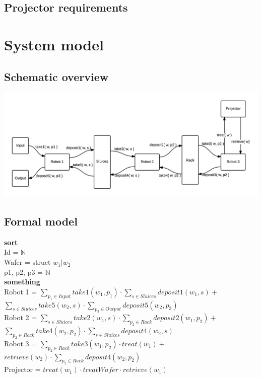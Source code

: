 \documentclass[12pt]{report}
\begin{document}
	\section{Projector requirements}
	\begin{itemize}
	\end{itemize}
	
	\chapter{System model}
	\section{Schematic overview}
	\includegraphics[scale=0.9]{modelschema}
	
	\section{Formal model}
	\textbf{sort}\\
		Id = $\mathbb{N}$\\
		Wafer = struct $w_1 | w_2$\\
		p1, p2, p3 = $\mathbb{N}$\\
		
	\textbf{something}\\
		Robot 1 = $\sum\nolimits_{p_1 \in Input} take1( w_1, p_1 ) \cdot \sum\nolimits_{s \in Sluices} deposit1( w_1, s ) +$\smallskip\\ 
		\- \hspace{4.3em} $\sum\nolimits_{s \in Sluices} take5( w_2, s ) \cdot \sum\nolimits_{p_3 \in Output} deposit5( w_2, p_3 )$\bigskip\\
		Robot 2 = $\sum\nolimits_{s \in Sluices} take2( w_1, s ) \cdot \sum\nolimits_{p_2 \in Rack} deposit2( w_1, p_2 ) +$\smallskip\\ 
		\- \hspace{4.3em} $\sum\nolimits_{p_2 \in Rack} take4( w_2, p_2 ) \cdot \sum\nolimits_{s \in Sluices} deposit4( w_2, s )$ \bigskip\\
		Robot 3 = $\sum\nolimits_{p_2 \in Rack} take3( w_1, p_2 ) \cdot treat( w_1 ) +$\smallskip\\ 
		\- \hspace{4.3em} $retrieve( w_2 ) \cdot \sum\nolimits_{p_2 \in Rack} deposit4( w_2, p_2 )$\bigskip\\
		Projector = $treat( w_1 ) \cdot treatWafer \cdot retrieve( w_1 )$
\end{document}
